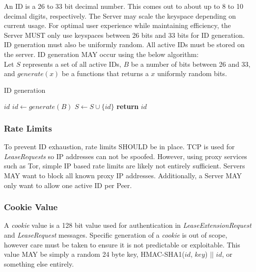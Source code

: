\documentclass{article}
\begin{document}
    An ID is a 26 to 33 bit decimal number. This comes out to about up to 8 to 10 decimal digits, respectively. The
    Server may scale the keyspace depending on current usage. For optimal user experience while maintaining
    efficiency, the Server MUST only use keyspaces between 26 bits and 33 bits for ID generation. ID generation must
    also be uniformly random. All active IDs must be stored on the server. ID generation MAY occur using the below
    algorithm:\\

    Let $S$ represents a set of all active IDs, $B$ be a number of bits between 26 and 33, and $generate(x)$ be a
    functions that returns a $x$ uniformly random bits.

    \begin{algorithm}
        \caption{ID generation}
        \begin{algorithmic}
            \State $id$
            \Repeat
                \State $id\gets generate(B)$
            \State $S\gets S\cup \{id\}$
            \State \textbf{return} $id$
        \end{algorithmic}
    \end{algorithm}

    \subsubsection{Rate Limits}

    To prevent ID exhaustion, rate limits SHOULD be in place. TCP is used for \emph{LeaseRequests} so IP addresses
    can not be spoofed. However, using proxy services such as Tor, simple IP based rate limits are likely not
    entirely sufficient. Servers MAY want to block all known proxy IP addresses. Additionally, a Server MAY only want
    to allow one active ID per Peer.

    \subsubsection{Cookie Value}

    A \emph{cookie} value is a 128 bit value used for authentication in \emph{LeaseExtensionRequest} and
    \emph{LeaseRequest} messages. Specific generation of a \emph{cookie} is out of scope, however care must be taken
    to ensure it is not predictable or exploitable. This value MAY be simply a random 24 byte key, HMAC-SHA1($id$,
    $key$) $||$ $id$, or something else entirely.
\end{document}
